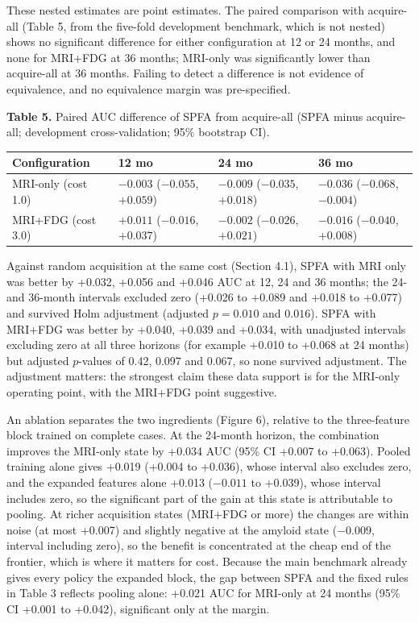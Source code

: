 \documentclass[12pt,twoside]{article}
\begin{document}
\begin{spacing}{1.0}
These nested estimates are point estimates. The paired comparison with
acquire-all (Table 5, from the five-fold development benchmark, which is not
nested) shows no significant difference for either configuration at 12 or 24
months, and none for MRI+FDG at 36 months; MRI-only was significantly lower
than acquire-all at 36 months. Failing to detect a difference is not
evidence of equivalence, and no equivalence margin was pre-specified.

\begin{table}[!htbp]
\centering
\textbf{Table 5.} Paired AUC difference of SPFA from acquire-all (SPFA minus
acquire-all; development cross-validation; 95\% bootstrap CI).\\\vspace{5pt}
\small
\begin{tabular}{|M{3.2cm}|M{3.55cm}|M{3.55cm}|M{3.55cm}|}
\hline
\textbf{Configuration} & \textbf{12 mo} & \textbf{24 mo} & \textbf{36 mo} \\
\hline
MRI-only (cost 1.0) & $-0.003$ ($-0.055$, $+0.059$) & $-0.009$ ($-0.035$, $+0.018$) & $-0.036$ ($-0.068$, $-0.004$) \\\hline
MRI+FDG (cost 3.0) & $+0.011$ ($-0.016$, $+0.037$) & $-0.002$ ($-0.026$, $+0.021$) & $-0.016$ ($-0.040$, $+0.008$) \\\hline
\end{tabular}
\end{table}

Against random acquisition at the same cost (Section 4.1), SPFA with MRI
only was better by +0.032, +0.056 and +0.046 AUC at 12, 24 and 36 months; the
24- and 36-month intervals excluded zero (+0.026 to +0.089 and +0.018 to
+0.077) and survived Holm adjustment (adjusted $p=0.010$ and $0.016$). SPFA
with MRI+FDG was better by +0.040, +0.039 and +0.034, with unadjusted
intervals excluding zero at all three horizons (for example +0.010 to +0.068
at 24 months) but adjusted $p$-values of 0.42, 0.097 and 0.067, so none
survived adjustment. The adjustment
matters: the strongest claim these data support is for the MRI-only operating
point, with the MRI+FDG point suggestive.

An ablation separates the two ingredients (Figure 6), relative to the
three-feature block trained on complete cases. At the 24-month horizon, the
combination improves the MRI-only state by +0.034 AUC
(95\% CI +0.007 to +0.063). Pooled training alone gives +0.019 (+0.004 to
+0.036), whose interval also excludes zero, and the expanded features alone
+0.013 ($-0.011$ to +0.039), whose interval includes zero, so the significant
part of the gain at this state is attributable to pooling. At richer
acquisition states (MRI+FDG or more) the changes are within noise (at most
+0.007) and slightly negative at the amyloid state ($-0.009$, interval
including zero), so the benefit is concentrated at the cheap end of the
frontier, which is where it matters for cost. Because the main benchmark
already gives every policy the expanded block, the gap between SPFA and the
fixed rules in Table 3 reflects pooling alone: +0.021 AUC for MRI-only at 24
months (95\% CI +0.001 to +0.042), significant only at the margin.



\end{spacing}
\end{document}
